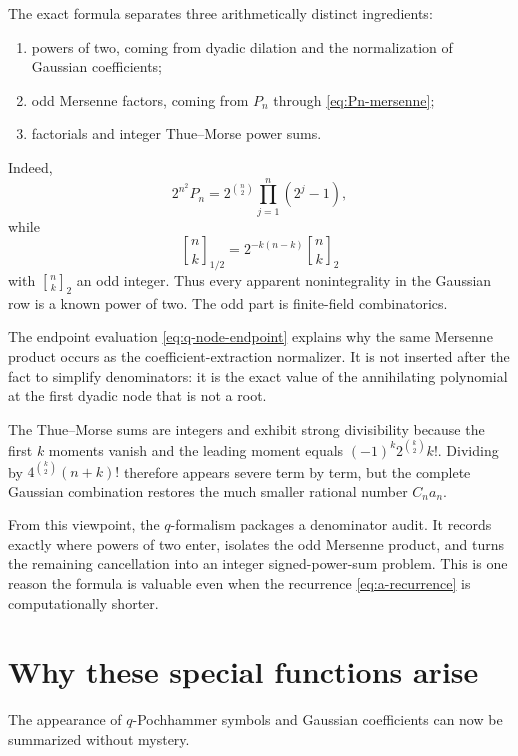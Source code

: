 \documentclass[11pt]{article}
\theoremstyle{definition}
\newcommand{\Qbin}[3]{\genfrac{[}{]}{0pt}{}{#1}{#2}_{#3}}
\begin{document}
The exact formula separates three arithmetically distinct ingredients:
\begin{enumerate}[leftmargin=2.2em]
  \item powers of two, coming from dyadic dilation and the normalization of Gaussian coefficients;
  \item odd Mersenne factors, coming from $P_n$ through \cref{eq:Pn-mersenne};
  \item factorials and integer Thue--Morse power sums.
\end{enumerate}
Indeed,
\begin{equation}
  2^{n^2}P_n
  =2^{\binom{n}{2}}\prod_{j=1}^{n}(2^j-1),
  \label{eq:arithmetic-normalizer-repeat}
\end{equation}
while
\begin{equation}
  \Qbin{n}{k}{1/2}
  =2^{-k(n-k)}\Qbin{n}{k}{2}
  \label{eq:arithmetic-gaussian-repeat}
\end{equation}
with $\Qbin{n}{k}{2}$ an odd integer.  Thus every apparent nonintegrality in the Gaussian row is a known power of two.  The odd part is finite-field combinatorics.

The endpoint evaluation \cref{eq:q-node-endpoint} explains why the same Mersenne product occurs as the coefficient-extraction normalizer.  It is not inserted after the fact to simplify denominators: it is the exact value of the annihilating polynomial at the first dyadic node that is not a root.

The Thue--Morse sums are integers and exhibit strong divisibility because the first $k$ moments vanish and the leading moment equals
$(-1)^k2^{\binom{k}{2}}k!$.  Dividing by
$4^{\binom{k}{2}}(n+k)!$ therefore appears severe term by term, but the complete Gaussian combination restores the much smaller rational number $C_na_n$.

From this viewpoint, the $q$-formalism packages a denominator audit.  It records exactly where powers of two enter, isolates the odd Mersenne product, and turns the remaining cancellation into an integer signed-power-sum problem.  This is one reason the formula is valuable even when the recurrence \cref{eq:a-recurrence} is computationally shorter.

\section{Why these special functions arise}
\label{sec:why-q}

The appearance of $q$-Pochhammer symbols and Gaussian coefficients can now be summarized without mystery.
\end{document}
